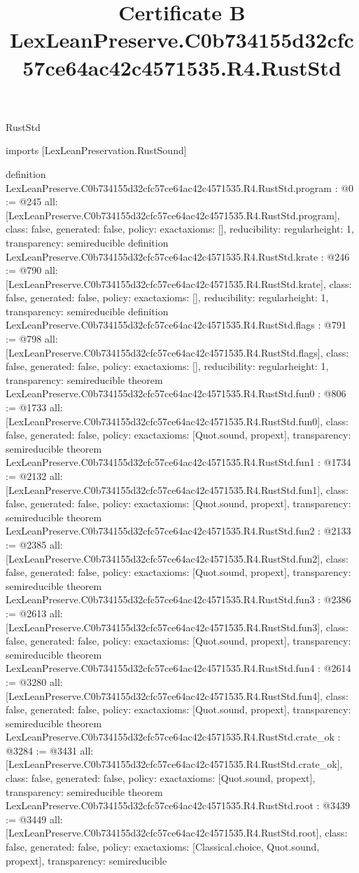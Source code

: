 \begin{lexlean}{RustStd}
\title{Certificate B LexLeanPreserve.C0b734155d32cfc57ce64ac42c4571535.R4.RustStd}
\begin{coremodule}
imports [LexLeanPreservation.RustSound]

definition LexLeanPreserve.C0b734155d32cfc57ce64ac42c4571535.R4.RustStd.program : @0 := @245 {
  all: [LexLeanPreserve.C0b734155d32cfc57ce64ac42c4571535.R4.RustStd.program],
  class: false,
  generated: false,
  policy: exact{axioms: []},
  reducibility: regular{height: 1},
  transparency: semireducible
}
definition LexLeanPreserve.C0b734155d32cfc57ce64ac42c4571535.R4.RustStd.krate : @246 := @790 {
  all: [LexLeanPreserve.C0b734155d32cfc57ce64ac42c4571535.R4.RustStd.krate],
  class: false,
  generated: false,
  policy: exact{axioms: []},
  reducibility: regular{height: 1},
  transparency: semireducible
}
definition LexLeanPreserve.C0b734155d32cfc57ce64ac42c4571535.R4.RustStd.flags : @791 := @798 {
  all: [LexLeanPreserve.C0b734155d32cfc57ce64ac42c4571535.R4.RustStd.flags],
  class: false,
  generated: false,
  policy: exact{axioms: []},
  reducibility: regular{height: 1},
  transparency: semireducible
}
theorem LexLeanPreserve.C0b734155d32cfc57ce64ac42c4571535.R4.RustStd.fun0 : @806 := @1733 {
  all: [LexLeanPreserve.C0b734155d32cfc57ce64ac42c4571535.R4.RustStd.fun0],
  class: false,
  generated: false,
  policy: exact{axioms: [Quot.sound, propext]},
  transparency: semireducible
}
theorem LexLeanPreserve.C0b734155d32cfc57ce64ac42c4571535.R4.RustStd.fun1 : @1734 := @2132 {
  all: [LexLeanPreserve.C0b734155d32cfc57ce64ac42c4571535.R4.RustStd.fun1],
  class: false,
  generated: false,
  policy: exact{axioms: [Quot.sound, propext]},
  transparency: semireducible
}
theorem LexLeanPreserve.C0b734155d32cfc57ce64ac42c4571535.R4.RustStd.fun2 : @2133 := @2385 {
  all: [LexLeanPreserve.C0b734155d32cfc57ce64ac42c4571535.R4.RustStd.fun2],
  class: false,
  generated: false,
  policy: exact{axioms: [Quot.sound, propext]},
  transparency: semireducible
}
theorem LexLeanPreserve.C0b734155d32cfc57ce64ac42c4571535.R4.RustStd.fun3 : @2386 := @2613 {
  all: [LexLeanPreserve.C0b734155d32cfc57ce64ac42c4571535.R4.RustStd.fun3],
  class: false,
  generated: false,
  policy: exact{axioms: [Quot.sound, propext]},
  transparency: semireducible
}
theorem LexLeanPreserve.C0b734155d32cfc57ce64ac42c4571535.R4.RustStd.fun4 : @2614 := @3280 {
  all: [LexLeanPreserve.C0b734155d32cfc57ce64ac42c4571535.R4.RustStd.fun4],
  class: false,
  generated: false,
  policy: exact{axioms: [Quot.sound, propext]},
  transparency: semireducible
}
theorem LexLeanPreserve.C0b734155d32cfc57ce64ac42c4571535.R4.RustStd.crate_ok : @3284 := @3431 {
  all: [LexLeanPreserve.C0b734155d32cfc57ce64ac42c4571535.R4.RustStd.crate_ok],
  class: false,
  generated: false,
  policy: exact{axioms: [Quot.sound, propext]},
  transparency: semireducible
}
theorem LexLeanPreserve.C0b734155d32cfc57ce64ac42c4571535.R4.RustStd.root : @3439 := @3449 {
  all: [LexLeanPreserve.C0b734155d32cfc57ce64ac42c4571535.R4.RustStd.root],
  class: false,
  generated: false,
  policy: exact{axioms: [Classical.choice, Quot.sound, propext]},
  transparency: semireducible
}


\end{coremodule}
\end{lexlean}
